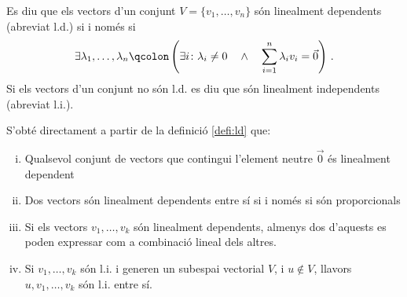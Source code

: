 \begin{defi}\label{defi:ld}
	Es diu que els vectors d'un conjunt $ V = \{v_1, \ldots, v_n\}$ són linealment dependents (abreviat l.d.) si i només si \[\exists \lambda_1, \ldots, \lambda_n\qcolon \left(\exists i \colon \lambda_i \ne 0 \quad\land\quad \sum_{i=1}^{n} \lambda_i v_i = \vec{0}\right)\,. \] Si els vectors d'un conjunt no són l.d. es diu que són linealment independents (abreviat l.i.).
	
	\begin{col}\label{col:ld}
		S'obté directament a partir de la definició \ref{defi:ld} que:
		\begin{enumerate}[i)]
			\item Qualsevol conjunt de vectors que contingui l'element neutre $\vec{0}$ és linealment dependent
			\item Dos vectors són linealment dependents entre sí si i només si són proporcionals
			\item Si els vectors $v_1, \ldots, v_k$ són linealment dependents, almenys dos d'aquests es poden expressar com a combinació lineal dels altres.
			\item Si $v_1, \ldots, v_k$ són l.i. i generen un subespai vectorial $V$, i $u\notin V$, llavors $u, v_1, \ldots, v_k$ són l.i. entre sí.
		\end{enumerate}
	\end{col}
\end{defi}

